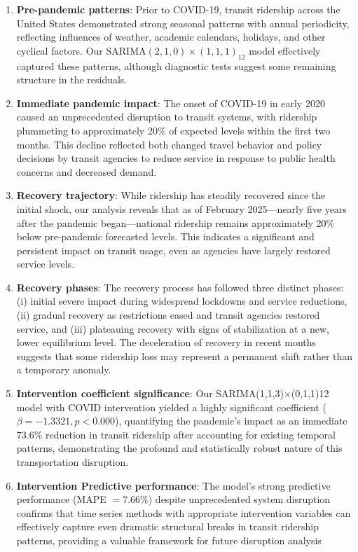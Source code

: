 \documentclass[11pt]{article}
\begin{document}
\begin{enumerate}
\item \textbf{Pre-pandemic patterns}: Prior to COVID-19, transit ridership across the United States demonstrated strong seasonal patterns with annual periodicity, reflecting influences of weather, academic calendars, holidays, and other cyclical factors. Our SARIMA$(2,1,0)\times(1,1,1)_{12}$ model effectively captured these patterns, although diagnostic tests suggest some remaining structure in the residuals.

\item \textbf{Immediate pandemic impact}: The onset of COVID-19 in early 2020 caused an unprecedented disruption to transit systems, with ridership plummeting to approximately 20\% of expected levels within the first two months. This decline reflected both changed travel behavior and policy decisions by transit agencies to reduce service in response to public health concerns and decreased demand.

\item \textbf{Recovery trajectory}: While ridership has steadily recovered since the initial shock, our analysis reveals that as of February 2025—nearly five years after the pandemic began—national ridership remains approximately 20\% below pre-pandemic forecasted levels. This indicates a significant and persistent impact on transit usage, even as agencies have largely restored service levels.

\item \textbf{Recovery phases}: The recovery process has followed three distinct phases: (i) initial severe impact during widespread lockdowns and service reductions, (ii) gradual recovery as restrictions eased and transit agencies restored service, and (iii) plateauing recovery with signs of stabilization at a new, lower equilibrium level. The deceleration of recovery in recent months suggests that some ridership loss may represent a permanent shift rather than a temporary anomaly.

\item \textbf{Intervention coefficient significance}: Our SARIMA(1,1,3)×(0,1,1)12 model with COVID intervention yielded a highly significant coefficient ($\beta = -1.3321, p < 0.000$), quantifying the pandemic's impact as an immediate $73.6\%$ reduction in transit ridership after accounting for existing temporal patterns, demonstrating the profound and statistically robust nature of this transportation disruption.

\item \textbf{Intervention Predictive performance}: The model's strong predictive performance (MAPE $= 7.66\%$) despite unprecedented system disruption confirms that time series methods with appropriate intervention variables can effectively capture even dramatic structural breaks in transit ridership patterns, providing a valuable framework for future disruption analysis


\end{enumerate}
\end{document}
